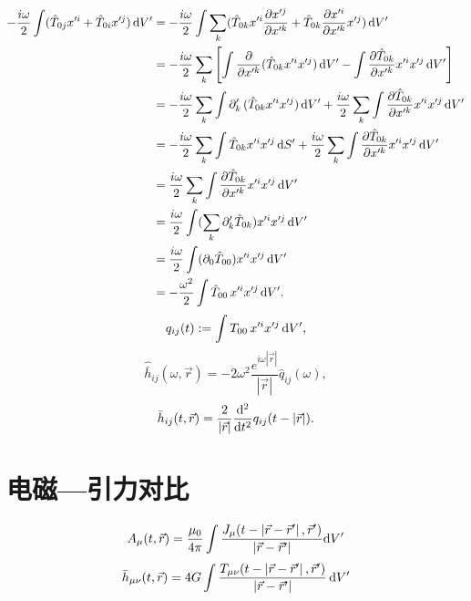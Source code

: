 \begin{align}
    -\frac{i\omega}{2}\int (\hat{T}_{0j}x'^{i}+\hat{T}_{0i}x'^{j})\,\mathrm{d} V'
    &= -\frac{i\omega}{2}\int \sum_{k}(\hat{T}_{0k}x'^{i}\frac{\partial x'^{j}}{\partial x'^{k}}+\hat{T}_{0k}\frac{\partial x'^{i}}{\partial x'^{k}}x'^{j})\,\mathrm{d} V'\\
    &= -\frac{i\omega}{2}\sum_{k}\left[\int \frac{\partial }{\partial x'^k}(\hat{T}_{0k}x'^ix'^j)\,\mathrm{d} V'-\int \frac{\partial \hat{T}_{0k}}{\partial x'^k}x'^ix'^j\,\mathrm{d} V'\right]\\
    &= -\frac{i\omega}{2}\sum_{k}\int \partial'_k\,(\hat{T}_{0k}x'^ix'^j)\,\mathrm{d} V' +\frac{i\omega}{2}\sum_{k}\int \frac{\partial \hat{T}_{0k}}{\partial x'^k}x'^ix'^j\,\mathrm{d} V'\\
    &= -\frac{i\omega}{2}\sum_{k}\int \hat{T}_{0k}x'^ix'^j\,\mathrm{d} S' +\frac{i\omega}{2}\sum_{k}\int \frac{\partial \hat{T}_{0k}}{\partial x'^k}x'^ix'^j\,\mathrm{d} V'\\
    &= \frac{i\omega}{2}\sum_{k}\int \frac{\partial \hat{T}_{0k}}{\partial x'^k}x'^ix'^j\,\mathrm{d} V'\\
    &= \frac{i\omega}{2}\int (\sum_{k}\partial'_k\hat{T}_{0k})x'^ix'^j\,\mathrm{d} V'\\
    &= \frac{i\omega}{2}\int (\partial_0\hat{T}_{00})x'^ix'^j\,\mathrm{d} V'\\
    &= -\frac{\omega^2}{2}\int \hat{T}_{00}\,x'^ix'^j\,\mathrm{d} V'.
\end{align}
\begin{equation}
    q_{ij}(t):=\int{T}_{00}\,x'^ix'^j\,\mathrm{d} V',
\end{equation}
\begin{equation}
    \hat{\bar{h}}_{ij}(\omega,\vec{r}) = -2\omega^2\frac{e^{i\omega\left\lvert\vec{r}\right\rvert}}{\left\lvert\vec{r}\right\rvert}\hat{q}_{ij}(\omega),
\end{equation}
\begin{equation}
    {\bar{h}}_{ij}(t,\vec{r}) = \frac{2}{\left\lvert\vec{r}\right\rvert}
    \frac{\mathrm{d}^2}{\mathrm{d} t^2}{q}_{ij}(t-\left\lvert\vec{r}\right\rvert).\label{qf}
\end{equation}

\section{电磁---引力对比}

\begin{equation}
    A_\mu(t,\vec{r})=\frac{\mu_0}{4\pi}\int\frac{J_\mu(t-\left\lvert \vec{r}-\vec{r}'\right\rvert ,\vec{r}')}{\left\lvert \vec{r}-\vec{r}'\right\rvert}\mathrm{d} V'
\end{equation}
\begin{equation}
    \bar{h}_{\mu\nu}(t,\vec{r})=4G\int\frac{T_{\mu\nu}(t-\left\lvert\vec{r}-\vec{r}'\right\rvert,\vec{r}')}{\left\lvert\vec{r}-\vec{r}'\right\rvert}\,\mathrm{d} V'
\end{equation}

